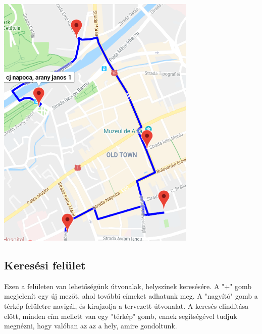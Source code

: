 \begin{minipage}{\linewidth}
\begin{multicols}{2}
	\setlength{\abovecaptionskip}{10pt}
		\begin{Figure}
			\includegraphics[width=\linewidth]{images/route}
		\end{Figure}
	\end{multicols}
\end{minipage}

\subsection{Keresési felület}

Ezen a felületen van lehetőségünk útvonalak, helyszínek keresésére. A "+" gomb megjelenít egy új mezőt, ahol további címeket adhatunk meg. A "nagyító" gomb a térkép felületre navigál, és kirajzolja a tervezett útvonalat. A keresés elindítása előtt, minden cím mellett van egy "térkép" gomb, ennek segítségével tudjuk megnézni, hogy valóban az az a hely, amire gondoltunk.

